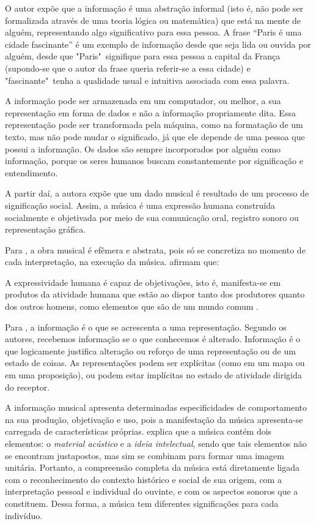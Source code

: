 O autor  expõe que a informação é uma abstração informal (isto é, não pode ser formalizada através de uma teoria lógica ou matemática) que está na mente de alguém, representando algo significativo para essa pessoa. A frase “Paris é uma cidade fascinante” é um exemplo de informação desde que seja lida ou ouvida por alguém, desde que "Paris"\ signifique para essa pessoa a capital da França (supondo-se que o autor da frase queria referir-se a essa cidade) e "fascinante"\ tenha a qualidade usual e intuitiva associada com essa palavra.

A informação pode ser armazenada em um computador, ou melhor, a sua representação em forma de dados e não a informação propriamente dita. Essa representação pode ser transformada pela máquina, como na formatação de um texto, mas não pode mudar o significado, já que ele depende de uma pessoa que possui a informação. Os dados são sempre incorporados por alguém como informação, porque os seres humanos buscam constantemente por significação e entendimento.

A partir daí, a autora  expõe que um dado musical é resultado de um processo de significação social. Assim, a música é uma expressão humana construída socialmente e objetivada por meio de sua comunicação oral, registro sonoro ou representação gráfica.

Para , a obra musical é efêmera e abstrata, pois só se concretiza no momento de cada interpretação, na execução da música.  afirmam que:

\begin{citacao}
A expressividade humana é capaz de objetivações, isto é, manifesta-se em produtos da atividade humana que estão ao dispor tanto dos produtores quanto dos outros homens, como elementos que são de um mundo comum \cite{berger&luckmann2014}.
\end{citacao}

Para , a informação é o que se acrescenta a uma representação. Segundo os autores, recebemos informação se o que conhecemos é alterado. Informação é o que logicamente justifica alteração ou reforço de uma representação ou de um estado de coisas. As representações podem ser explícitas (como em um mapa ou em uma proposição), ou podem estar implícitas no estado de atividade dirigida do receptor.

A informação musical apresenta determinadas especificidades de comportamento na sua produção, objetivação e uso, pois a manifestação da música apresenta-se carregada de características próprias.  explica que a música contém dois elementos: o \textit{material acústico} e a \textit{ideia intelectual}, sendo que tais elementos não se encontram justapostos, mas sim se combinam para formar uma imagem unitária. Portanto, a compreensão completa da música está diretamente ligada com o reconhecimento do contexto histórico e social de sua origem, com a interpretação pessoal e individual do ouvinte, e com os aspectos sonoros que a constituem. Dessa forma, a música tem diferentes significações para cada indivíduo.


